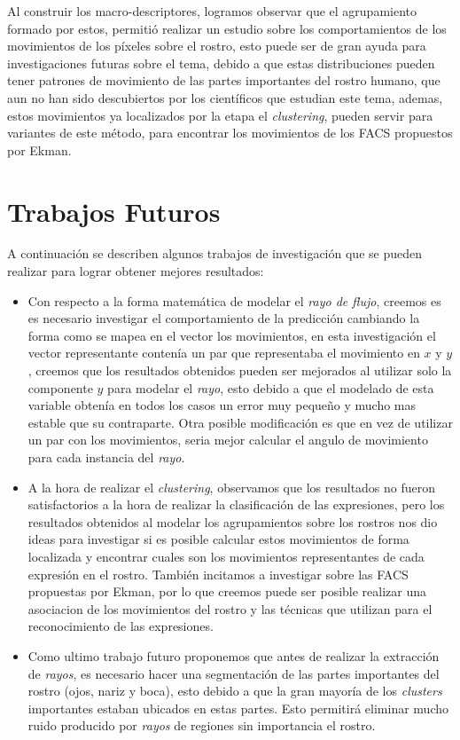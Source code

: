 Al construir los macro-descriptores, logramos observar que el agrupamiento formado por estos, permitió realizar un estudio sobre los comportamientos de los movimientos de los píxeles sobre el rostro, esto puede ser de gran ayuda para investigaciones futuras sobre el tema, debido a que estas distribuciones pueden tener patrones de movimiento de las partes importantes del rostro humano, que aun no han sido descubiertos por los científicos que estudian este tema, ademas, estos movimientos ya localizados por la etapa el \textit{clustering}, pueden servir para variantes de este método, para encontrar los movimientos de los FACS propuestos por Ekman.

\section{Trabajos Futuros}

A continuación se describen algunos trabajos de investigación que se pueden realizar para lograr obtener mejores resultados:

\begin{itemize}
	
	\item Con respecto a la forma matemática de modelar el \textit{rayo de flujo}, creemos es es necesario investigar el comportamiento de la predicción cambiando la forma como se mapea en el vector los movimientos, en esta investigación el vector representante contenía un par que representaba el movimiento en $x$ y $y$, creemos que los resultados obtenidos pueden ser mejorados al utilizar solo la componente $y$ para modelar el \textit{rayo}, esto debido a que el modelado de esta variable obtenía en todos los casos un error muy pequeño y mucho mas estable que su contraparte. Otra posible modificación es que en vez de utilizar un par con los movimientos, seria mejor calcular el angulo de movimiento para cada instancia del \textit{rayo}.
	
	\item A la hora de realizar el \textit{clustering}, observamos que los resultados no fueron satisfactorios a la hora de realizar la clasificación de las expresiones, pero los resultados obtenidos al modelar los agrupamientos sobre los rostros nos dio ideas para investigar si es posible calcular estos movimientos de forma localizada y encontrar cuales son los movimientos representantes de cada expresión en el rostro. También incitamos a investigar sobre las FACS propuestas por Ekman, por lo que creemos puede ser posible realizar una asociacion de los movimientos del rostro y las técnicas que utilizan para el reconocimiento de las expresiones.
	
	\item Como ultimo trabajo futuro proponemos que antes de realizar la extracción de \textit{rayos}, es necesario hacer una segmentación de las partes importantes del rostro (ojos, nariz y boca), esto debido a que la gran mayoría de los \textit{clusters} importantes estaban ubicados en estas partes. Esto permitirá eliminar mucho ruido producido por \textit{rayos} de regiones sin importancia el rostro.
	
\end{itemize}
